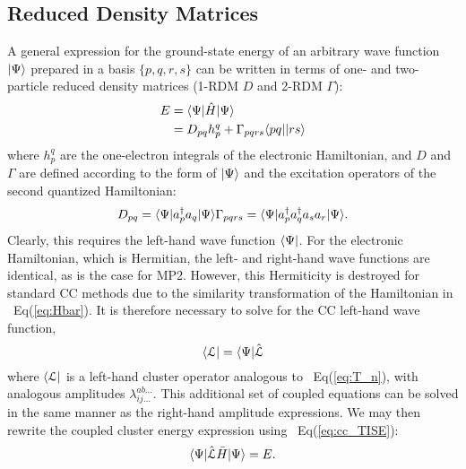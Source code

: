 \subsection{Reduced Density Matrices} \label{ss:rdm} A general expression
for the ground-state energy of an arbitrary wave function $| \Psi \rangle$
prepared in a basis $\{p,q,r,s\}$ can be written in terms of one- and
two-particle reduced density matrices (1-RDM $D$ and 2-RDM $\Gamma$):
\begin{equation} \label{eq:pdm_e}
    \begin{aligned} E & = \langle\Psi |\hat{H}| \Psi \rangle \\
      & = D_{pq}h_{p}^{q} + \Gamma_{pqrs}\langle pq || rs \rangle
    \end{aligned}
\end{equation} where $h_{p}^{q}$ are the one-electron integrals of the
electronic Hamiltonian, and $D$ and $\Gamma$ are defined according to the
form of $| \Psi \rangle$ and the excitation operators of the second quantized
Hamiltonian: \begin{subequations} \begin{equation} \label{eq:opdm}
    D_{pq} = \bra{\Psi}a_p^{\dagger}a_q\ket{\Psi}
\end{equation} \begin{equation} \label{eq:tpdm}
    \Gamma_{pqrs} = \bra{\Psi}a_p^{\dagger}a_q^{\dagger}a_sa_r\ket{\Psi}.
\end{equation} \end{subequations} 
Clearly, this requires the
left-hand wave function $\langle\Psi |$. For the electronic Hamiltonian,
which is Hermitian, the left- and right-hand wave functions are identical,
as is the case for MP2. However, this Hermiticity is destroyed for standard
CC methods due to the similarity transformation of the Hamiltonian in
~Eq(\ref{eq:Hbar}). It is therefore necessary to solve for the CC left-hand
wave function, \begin{equation} \label{eq:cc_lwfn}
    \langle\mathcal{L} | = \langle\Psi |\hat{\mathcal{L}}
\end{equation} where $\langle\mathcal{L} |$ is a left-hand cluster
operator analogous to ~Eq(\ref{eq:T_n}), with analogous amplitudes
$\lambda_{ij\ldots}^{ab\ldots}$. This additional set of coupled
equations can be solved in the same manner as the right-hand amplitude
expressions. We may then rewrite the coupled cluster energy expression
using ~Eq(\ref{eq:cc_TISE}): \begin{equation} \label{eq:cc_energy_total}
    \langle\Psi |\hat{\mathcal{L}}\bar{H}| \Psi \rangle = E.
\end{equation}

